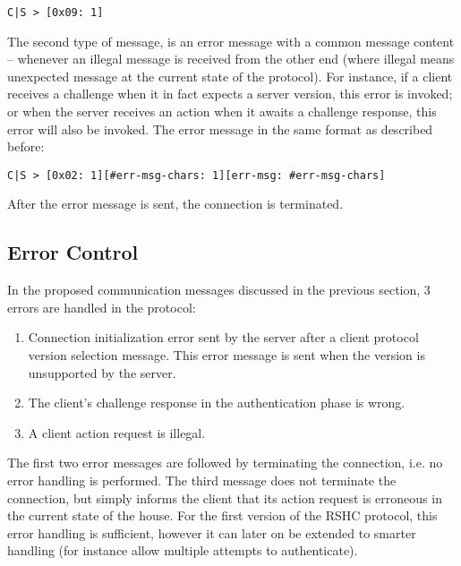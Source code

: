 \begin{verbatim}
C|S > [0x09: 1]
\end{verbatim}

\noindent
The second type of message, is an error message with a common message content -- whenever an illegal message is received from the other end (where illegal means unexpected message at the current state of the protocol). For instance, if a client receives a challenge when it in fact expects a server version, this error is invoked; or when the server receives an action when it awaits a challenge response, this error will also be invoked. The error message in the same format as described before:

\begin{verbatim}
C|S > [0x02: 1][#err-msg-chars: 1][err-msg: #err-msg-chars]
\end{verbatim}

\noindent
After the error message is sent, the connection is terminated.


\subsection{Error Control}
\label{sec:pdus:err}

In the proposed communication messages discussed in the previous section, 3 errors are handled in the protocol:
\begin{enumerate}
\item Connection initialization error sent by the server after a client protocol version selection message. This error message is sent when the version is unsupported by the server.
\item The client's challenge response in the authentication phase is wrong.
\item A client action request is illegal.
\end{enumerate}

The first two error messages are followed by terminating the connection, i.e. no error handling is performed. The third message does not terminate the connection, but simply informs the client that its action request is erroneous in the current state of the house. For the first version of the RSHC protocol, this error handling is sufficient, however it can later on be extended to smarter handling (for instance allow multiple attempts to authenticate).


